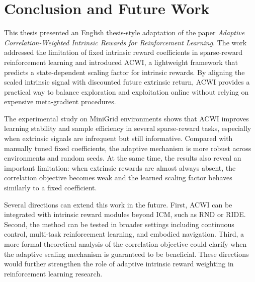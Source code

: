 \chapter*{Conclusion and Future Work}

This thesis presented an English thesis-style adaptation of the paper \textit{Adaptive Correlation-Weighted Intrinsic Rewards for Reinforcement Learning}. The work addressed the limitation of fixed intrinsic reward coefficients in sparse-reward reinforcement learning and introduced ACWI, a lightweight framework that predicts a state-dependent scaling factor for intrinsic rewards. By aligning the scaled intrinsic signal with discounted future extrinsic return, ACWI provides a practical way to balance exploration and exploitation online without relying on expensive meta-gradient procedures.

The experimental study on MiniGrid environments shows that ACWI improves learning stability and sample efficiency in several sparse-reward tasks, especially when extrinsic signals are infrequent but still informative. Compared with manually tuned fixed coefficients, the adaptive mechanism is more robust across environments and random seeds. At the same time, the results also reveal an important limitation: when extrinsic rewards are almost always absent, the correlation objective becomes weak and the learned scaling factor behaves similarly to a fixed coefficient.

Several directions can extend this work in the future. First, ACWI can be integrated with intrinsic reward modules beyond ICM, such as RND or RIDE. Second, the method can be tested in broader settings including continuous control, multi-task reinforcement learning, and embodied navigation. Third, a more formal theoretical analysis of the correlation objective could clarify when the adaptive scaling mechanism is guaranteed to be beneficial. These directions would further strengthen the role of adaptive intrinsic reward weighting in reinforcement learning research.
